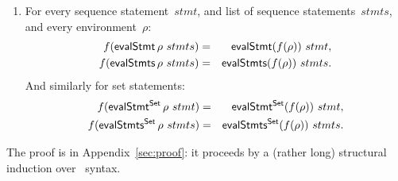 \begin{prop}
\begin{enumerate}

\item\label{item:evalStmts} For every sequence statement~$stmt$, and list
  of sequence statements~$stmts$, and every environment~$\rho$:
\begin{eqnarray*}
f (\mathop{\sf evalStmt} \rho ~ stmts) & = & \mathop{\sf evalStmt} (f(\rho))~stmt, \\
f (\mathop{\sf evalStmts} \rho ~ stmts) & = & \mathop{\sf evalStmts} (f(\rho))~stmts.
\end{eqnarray*}
%
And similarly for set statements:
%
\begin{eqnarray*}
f (\mathop{\sf evalStmt^{Set}} \rho ~ stmt) & = & \mathop{\sf evalStmt^{Set}} (f(\rho))~stmt, \\
f (\mathop{\sf evalStmts^{Set}} \rho ~ stmts) & = & \mathop{\sf evalStmts^{Set}} (f(\rho))~stmts.
\end{eqnarray*}
\end{enumerate}
\end{prop}
%
The proof is in Appendix~\ref{sec:proof}: it proceeds by a (rather long)
structural induction over \CSPm\ syntax.  

